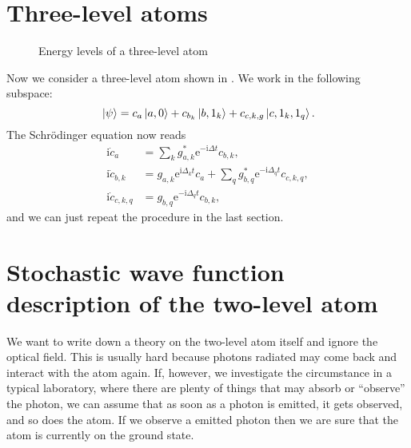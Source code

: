 \documentclass[hyperref, a4paper]{article}
\newcommand*{\ii}{\mathrm{i}}
\newcommand*{\ee}{\mathrm{e}}
\begin{document}
\section{Three-level atoms}

\begin{figure}
    \centering
    
    \caption{Energy levels of a three-level atom}
    \label{fig:three-level-atom}
\end{figure}

Now we consider a three-level atom shown in . We work in the following 
subspace:
\begin{equation}
    \ket*{\psi} = c_a \ket*{a, 0} + c_{b_k} \ket*{b, 1_k} + c_{c, k, g} \ket*{c, 1_k, 1_q}. 
\end{equation}
The Schrödinger equation now reads 
\begin{equation}
    \begin{aligned}
        \ii \dot{c}_a &= \sum_k g_{a, k}^* \ee^{- \ii \Delta t} c_{b, k}, \\
        \ii \dot{c}_{b, k} &= g_{a,k} \ee^{\ii \Delta_k t} c_a 
        + \sum_q g^*_{b,q} \ee^{- \ii \Delta_q t} c_{c, k, q}, \\
        \ii \dot{c}_{c, k, q} &= g_{b,q} \ee^{- \ii \Delta_q t} c_{b, k},
    \end{aligned}
\end{equation} 
and we can just repeat the procedure in the last section.

\section{Stochastic wave function description of the two-level atom}\label{sec:stochastic-two-level}

We want to write down a theory on the two-level atom itself and ignore the optical field. 
This is usually hard because photons radiated may come back and interact with the atom again.
If, however, we investigate the circumstance in a typical laboratory, where there are plenty 
of things that may absorb or ``observe'' the photon, we can assume that as soon as a photon 
is emitted, it gets observed, and so does the atom. If we observe a emitted photon then we are sure 
that the atom is currently on the ground state.
\end{document}

